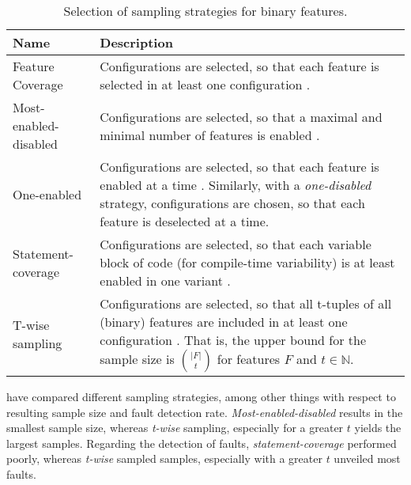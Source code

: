 \begin{table}[h!]
	\centering
	\begin{tabular}{lp{11cm}}
	\toprule
	\textbf{Name} & \textbf{Description} \\
	\midrule
	Feature Coverage & Configurations are selected, so that each
  feature is selected in at least one configuration
  \citep{apel_feature-oriented_2013}.\\
  \midrule
  Most-enabled-disabled & Configurations are selected, so that a
  maximal and minimal number of features is enabled
  \citep{medeiros_comparison_2016}. \\
  \midrule
  One-enabled & Configurations are selected, so
  that each feature is enabled at a time \citep{abal_42_2014}. Similarly, with a
  \emph{one-disabled} strategy, configurations are chosen, so that each feature
  is deselected at a time. \\
  \midrule
  Statement-coverage & Configurations are
  selected, so that each variable block of code (for
  compile-time variability) is at least enabled in one
  variant \citep{tartler_static_2014}. \\
  \midrule
  T-wise sampling & Configurations are selected, so that all
  t-tuples of all (binary) features are included in at least one configuration
  \citep{williams_practical_1996}. That is, the upper bound for the sample size
  is $\binom{|F|}{t}$ for features $F$ and $t \in \mathbb{N}$.\\  
	\bottomrule
	\end{tabular}
	\caption{Selection of sampling strategies for binary features.}
	\label{tab:sampling}
\end{table}

\cite{medeiros_comparison_2016} have compared different sampling strategies,
among other things with respect to resulting sample size and fault detection
rate. \emph{Most-enabled-disabled} results in the smallest
sample size, whereas \emph{t-wise} sampling, especially for a greater $t$ yields
the largest samples. Regarding the detection of faults,
\emph{statement-coverage} performed poorly, whereas \emph{t-wise} sampled
samples, especially with a greater $t$ unveiled most faults. 


